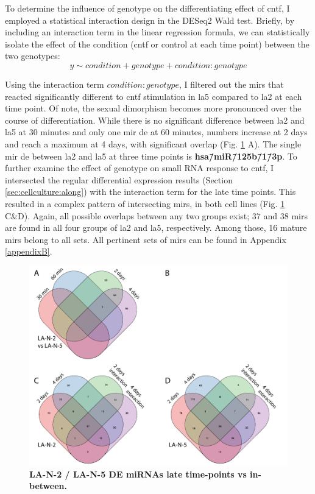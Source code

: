 To determine the influence of genotype on the differentiating effect of \ac{cntf}, I employed a statistical interaction design in the DESeq2 Wald test. Briefly, by including an interaction term in the linear regression formula, we can statistically isolate the effect of the condition (\ac{cntf} or control at each time point) between the two genotypes: $$y \sim condition + genotype + condition:genotype$$

Using the interaction term $condition:genotype$, I filtered out the \acp{mir} that reacted significantly different to \ac{cntf} stimulation in \ac{la5} compared to \ac{la2} at each time point. Of note, the sexual dimorphism becomes more pronounced over the course of differentiation. While there is no significant difference between \ac{la2} and \ac{la5} at 30 minutes and only one \ac{mir} \ac{de} at 60 minutes, numbers increase at 2 days and reach a maximum at 4 days, with significant overlap (Fig. \ref{fig:la2-vs-la5-overlap-venn} A). The single \ac{mir} \ac{de} between \ac{la2} and \ac{la5} at three time points is \textbf{hsa\=/miR\=/125b\=/1\=/3p}.  To further examine the effect of genotype on small RNA response to \ac{cntf}, I intersected the regular differential expression results (Section \ref{sec:cellculture:along}) with the interaction term for the late time points. This resulted in a complex pattern of intersecting \acp{mir}, in both cell lines (Fig. \ref{fig:la2-vs-la5-overlap-venn} C\&D). Again, all possible overlaps between any two groups exist; 37 and 38 \acp{mir} are found in all four groups of \ac{la2} and \ac{la5}, respectively. Among those, 16 mature \acp{mir} belong to all sets. All pertinent sets of \acp{mir} can be found in Appendix \ref{appendixB}. 

\begin{figure}
\centering
\includegraphics[width=\textwidth]{figures/la2-vs-la5-overlap-venn}
\caption[LA-N-2 / LA-N-5 DE miRNAs late time points vs in-between.]{\textbf{LA-N-2 / LA-N-5 DE miRNAs late time-points vs in-between.}
\label{fig:la2-vs-la5-overlap-venn}}
\end{figure}

